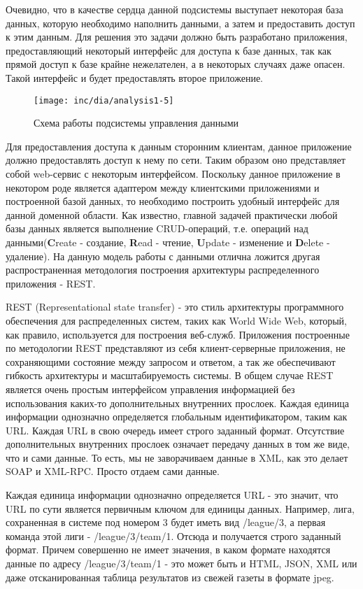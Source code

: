Очевидно, что в качестве сердца данной подсистемы выступает некоторая база данных, которую необходимо наполнить данными, а затем и предоставить доступ к этим данным. Для решения это задачи должно быть разработано приложения, предоставляющий некоторый интерфейс для доступа к базе данных, так как прямой доступ к базе крайне нежелателен, а в некоторых случаях даже опасен. Такой интерфейс и будет предоставлять второе приложение.

\begin{figure}
  \centering
  \texttt{[image: inc/dia/analysis1-5]}
  \caption{Схема работы подсистемы управления данными}
  \label{fig:fig05}
\end{figure}

Для предоставления доступа к данным сторонним клиентам, данное приложение должно предоставлять доступ к нему по сети. Таким образом оно представляет собой web-сервис с некоторым интерфейсом. Поскольку данное приложение в некотором роде является адаптером между клиентскими приложениями и построенной базой данных, то необходимо построить удобный интерфейс для данной доменной области. Как известно, главной задачей практически любой базы данных является выполнение CRUD-операций, т.е. операций над данными({\bf C}reate - создание, {\bf R}ead - чтение, {\bf U}pdate - изменение и {\bf D}elete - удаление). На данную модель работы с данными отлична ложится другая распространенная методология построения архитектуры распределенного приложения - REST.

REST (Representational state transfer) - это стиль архитектуры программного обеспечения для распределенных систем, таких как World Wide Web, который, как правило, используется для построения веб-служб. Приложения построенные по методологии REST представляют из себя клиент-серверные приложения, не сохраняющими состояние между запросом и ответом, а так же обеспечивают гибкость архитектуры и масштабируемость системы. В общем случае REST является очень простым интерфейсом управления информацией без использования каких-то дополнительных внутренних прослоек. Каждая единица информации однозначно определяется глобальным идентификатором, таким как URL. Каждая URL в свою очередь имеет строго заданный формат. Отсутствие дополнительных внутренних прослоек означает передачу данных в том же виде, что и сами данные. То есть, мы не заворачиваем данные в XML, как это делает SOAP и XML-RPC. Просто отдаем сами данные.

Каждая единица информации однозначно определяется URL - это значит, что URL по сути является первичным ключом для единицы данных. Например, лига, сохраненная в системе под номером 3 будет иметь вид /league/3, а первая команда этой лиги - /league/3/team/1. Отсюда и получается строго заданный формат. Причем совершенно не имеет значения, в каком формате находятся данные по адресу /league/3/team/1 - это может быть и HTML, JSON, XML или даже отсканированная таблица результатов из свежей газеты в формате jpeg.

